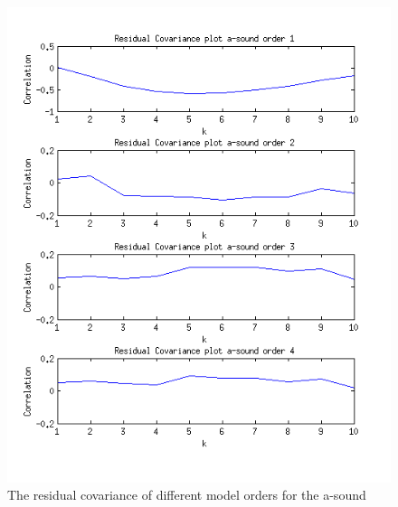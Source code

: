 \documentclass[12pt]{article}
\begin{document}
\begin{figure}[H]
  \centering
  \includegraphics[width=14cm]{residual_covariance_a.png}
  \caption{
    \label{res_cov_a}
    The residual covariance of different model orders for the a-sound}
\end{figure}
\end{document}
